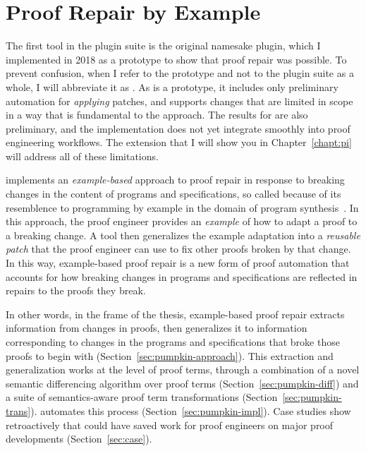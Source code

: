 \chapter{Proof Repair by Example}
\label{ch:example}

The first tool in the \sysnamelong plugin suite is the original namesake \sysnamelong plugin, which I implemented in 2018 as a prototype to show that proof repair was possible.
To prevent confusion, when I refer to the \sysnamelong prototype and not to the plugin suite as a whole, I will abbreviate it as \sysname.
As \sysname is a prototype, it includes only preliminary automation for \textit{applying} patches,
and supports changes that are limited in scope in a way that is fundamental to the approach.
The results for \sysname are also preliminary, and the implementation does not yet integrate smoothly into proof engineering workflows.
The \toolnamec extension that I will show you in Chapter~\ref{chapt:pi} will address all of these limitations.

\sysname implements an \textit{example-based} approach to proof repair in response to breaking changes in the content of programs and specifications,
so called because of its resemblence to programming by example in the domain of program synthesis~\cite{DBLP:journals/ftpl/GulwaniPS17}.
In this approach, the proof engineer provides an \textit{example} of how to adapt a proof to a breaking change.
A tool then generalizes the example adaptation into a \textit{reusable patch} that the proof engineer can use to fix other proofs broken by that change.
In this way, example-based proof repair is a new form of proof automation that accounts for how breaking changes in programs and specifications
are reflected in repairs to the proofs they break.

In other words, in the frame of the thesis, example-based proof repair extracts information from changes in proofs,
then generalizes it to information corresponding to changes in the programs and specifications that broke those proofs to begin with (Section~\ref{sec:pumpkin-approach}).
This extraction and generalization works at the level of proof terms, through a combination of a novel semantic differencing algorithm over proof terms (Section~\ref{sec:pumpkin-diff}) and 
a suite of semantics-aware proof term transformations (Section~\ref{sec:pumpkin-trans}).
\sysname automates this process (Section~\ref{sec:pumpkin-impl}).
Case studies show retroactively that \sysname could have saved work for proof engineers
on major proof developments (Section~\ref{sec:case}).















